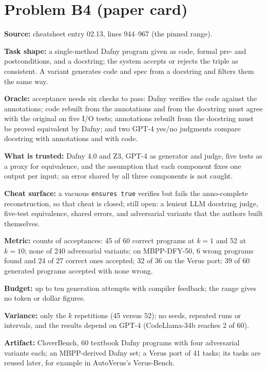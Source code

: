 \documentclass[11pt]{article}
\begin{document}
\section*{Problem B4 (paper card)}\label{ans:B4}
\begin{answer}
\textbf{Source:} cheatsheet entry 02.13, lines 944--967 (the pinned range).

\textbf{Task shape:} a single-method Dafny program given as code, formal pre-
and postconditions, and a docstring; the system accepts or rejects the triple
as consistent. A variant generates code and spec from a docstring and filters
them the same way.

\textbf{Oracle:} acceptance needs six checks to pass: Dafny verifies the code
against the annotations; code rebuilt from the annotations and from the
docstring must agree with the original on five I/O tests; annotations rebuilt
from the docstring must be proved equivalent by Dafny; and two GPT-4 yes/no
judgments compare docstring with annotations and with code.

\textbf{What is trusted:} Dafny 4.0 and Z3, GPT-4 as generator and judge, five
tests as a proxy for equivalence, and the assumption that each component
fixes one output per input; an error shared by all three components is not
caught.

\textbf{Cheat surface:} a vacuous \texttt{ensures true} verifies but fails the
anno-complete reconstruction, so that cheat is closed; still open: a lenient
LLM docstring judge, five-test equivalence, shared errors, and adversarial
variants that the authors built themselves.

\textbf{Metric:} counts of acceptances: 45 of 60 correct programs at $k = 1$ and
52 at $k = 10$; none of 240 adversarial variants; on MBPP-DFY-50, 6 wrong
programs found and 24 of 27 correct ones accepted; 32 of 36 on the Verus port;
39 of 60 generated programs accepted with none wrong.

\textbf{Budget:} up to ten generation attempts with compiler feedback; the
range gives no token or dollar figures.

\textbf{Variance:} only the $k$ repetitions (45 versus 52); no seeds, repeated
runs or intervals, and the results depend on GPT-4 (CodeLlama-34b reaches 2
of 60).

\textbf{Artifact:} CloverBench, 60 textbook Dafny programs with four
adversarial variants each; an MBPP-derived Dafny set; a Verus port of 41
tasks; its tasks are reused later, for example in AutoVerus's Verus-Bench.
\end{answer}
\end{document}
